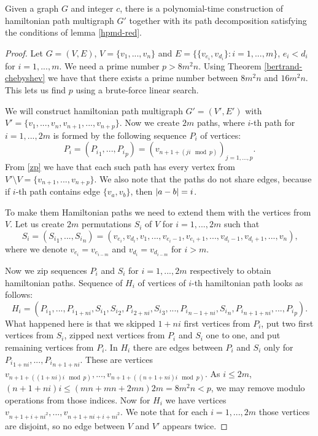 \begin{lmm}
Given a graph $G$ and integer $c$, there is a polynomial-time construction
of hamiltonian path multigraph $G'$ together with its path decomposition
satisfying the conditions of lemma \ref{hpmd-red}.
\end{lmm}

\begin{proof}
Let $G = (V,E)$, $V = \{v_1, ..., v_n\}$ and $E = \{\{v_{e_i}, v_{d_i}\}: i = 1, ..., m\}$,
$e_i < d_i$ for $i=1,...,m$.
We need a prime number $p > 8m^2 n$.
Using Theorem \ref{bertrand-chebyshev} we have that there exists a prime number between $8m^2n$ and $16m^2 n$.
This lets us find $p$ using a brute-force linear search.

We will construct hamiltonian path multigraph $G' = (V',E')$
with $V' = \{v_1, ..., v_n, v_{n+1}, ..., v_{n+p}\}$. 
Now we create $2m$ paths, where $i$-th path for $i=1,...,2m$
is formed by the following sequence $P_i$ of vertices:
$$ P_i = ({P_i}_1, ..., {P_i}_p) =  (v_{n+1+(ji \mod p)})_{j=1,...,p} \text{.}$$ 
From \eqref{zp} we have that each such path has every vertex from
$V' \setminus V = \{v_{n+1}, ..., v_{n+p}\}$.
We also note that the paths do not share edges,
because if $i$-th path contains edge $\{v_a, v_b\}$, then $\left\vert a-b \right\vert = i$.

To make them Hamiltonian paths we need to extend them with the vertices from $V$.
Let us create $2m$ permutations $S_i$ of $V$ for $i=1,...,2m$ such that
$$S_i = ({S_i}_1, ..., {S_i}_n) =
(v_{e_i}, v_{d_i}, v_1, ..., v_{e_i-1}, v_{e_i+1}, ..., v_{d_i-1}, v_{d_i+1}, ..., v_n)\text{,}$$
where we denote $v_{e_i} = v_{e_{i-m}}$ and $v_{d_i} = v_{d_{i-m}}$ for $i>m$. 

Now we zip sequences $P_i$ and $S_i$ for $i=1,...,2m$ respectively to obtain hamiltonian paths.
Sequence of $H_i$ of vertices of $i$-th hamiltonian path looks as follows:
$$H_i = ({P_i}_1, ..., {P_i}_{1+ni}, {S_i}_1, {S_i}_2, {P_i}_{2+ni}, {S_i}_3, ..., {P_i}_{n-1+ni}, {S_i}_n,
{P_i}_{n+1+ni}, ..., {P_i}_p) \text{.}$$
What happened here is that we skipped $1+ni$ first vertices from $P_i$,
put two first vertices from $S_i$, zipped next vertices from $P_i$ and $S_i$ one to one,
and put remaining vertices from $P_i$.
In $H_i$ there are edges between $P_i$ and $S_i$ only for ${P_i}_{1+ni}, ..., {P_i}_{n+1+ni}$.
These are vertices $v_{n+1+((1+ni)i \mod p)}, ..., v_{n+1+((n+1+ni)i \mod p)} $.
As $i \leq 2m$, $(n+1+ni)i \leq (mn+mn+2mn)2m = 8m^2 n < p$,
we may remove modulo operations from those indices.
Now for $H_i$ we have vertices $v_{n+1+i+ni^2}, ..., v_{n+1+ni+i+ni^2}$.
We note that for each $i=1,...,2m$ those vertices are disjoint, so no edge between $V$ and $V'$ appears twice.


\end{proof}
